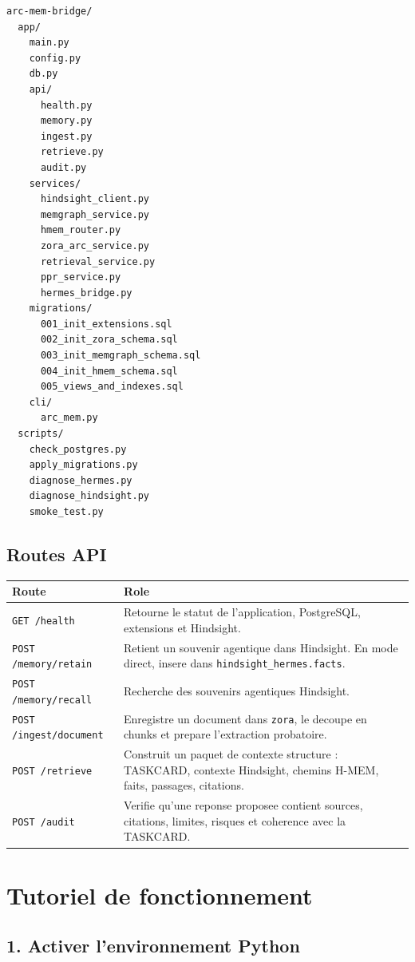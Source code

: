 \documentclass[11pt,a4paper]{article}
\begin{document}
\begin{lstlisting}
arc-mem-bridge/
  app/
    main.py
    config.py
    db.py
    api/
      health.py
      memory.py
      ingest.py
      retrieve.py
      audit.py
    services/
      hindsight_client.py
      memgraph_service.py
      hmem_router.py
      zora_arc_service.py
      retrieval_service.py
      ppr_service.py
      hermes_bridge.py
    migrations/
      001_init_extensions.sql
      002_init_zora_schema.sql
      003_init_memgraph_schema.sql
      004_init_hmem_schema.sql
      005_views_and_indexes.sql
    cli/
      arc_mem.py
  scripts/
    check_postgres.py
    apply_migrations.py
    diagnose_hermes.py
    diagnose_hindsight.py
    smoke_test.py
\end{lstlisting}

\subsection{Routes API}

\begin{longtable}{|p{4cm}|p{10cm}|}
\hline
\textbf{Route} & \textbf{Role} \\
\hline
\texttt{GET /health} & Retourne le statut de l'application, PostgreSQL,
extensions et Hindsight. \\
\hline
\texttt{POST /memory/retain} & Retient un souvenir agentique dans Hindsight.
En mode direct, insere dans \texttt{hindsight\_hermes.facts}. \\
\hline
\texttt{POST /memory/recall} & Recherche des souvenirs agentiques Hindsight. \\
\hline
\texttt{POST /ingest/document} & Enregistre un document dans \texttt{zora},
le decoupe en chunks et prepare l'extraction probatoire. \\
\hline
\texttt{POST /retrieve} & Construit un paquet de contexte structure :
TASKCARD, contexte Hindsight, chemins H-MEM, faits, passages, citations. \\
\hline
\texttt{POST /audit} & Verifie qu'une reponse proposee contient sources,
citations, limites, risques et coherence avec la TASKCARD. \\
\hline
\end{longtable}

\section{Tutoriel de fonctionnement}

\subsection{1. Activer l'environnement Python}
\end{document}
